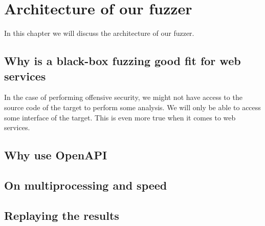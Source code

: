 \chapter{Architecture of our fuzzer}
In this chapter we will discuss the architecture of our fuzzer.

\section{Why is a black-box fuzzing good fit for web services}
In the case of performing offensive security, we might not have access to the source code of the target to perform some analysis. We will only be able to access some interface of the target. This is even more true when it comes to web services.

\section{Why use OpenAPI}

\section{On multiprocessing and speed}

\section{Replaying the results}
